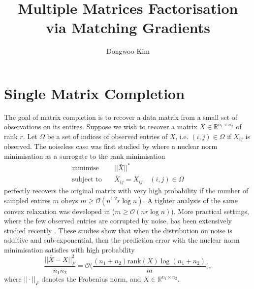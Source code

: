 \documentclass{article} %
\title{Multiple Matrices Factorisation\\ via Matching Gradients}
\author{
Dongwoo Kim
}
\theoremstyle{definition}
\begin{document}
\maketitle

\section{Single Matrix Completion}
The goal of matrix completion is to recover a data matrix from a small set of observations on its entires. Suppose we wish to recover a matrix $X \in \mathbb{R}^{n_1 \times n_2}$ of rank $r$. Let $\Omega$ be a set of indices of observed entries of $X$, i.e. $(i,j) \in \Omega$ if $X_{ij}$ is observed. The noiseless case was first studied by \cite{candes2009exact} where a nuclear norm minimisation as a surrogate to the rank minimisation
\begin{align}
\text{minimise}&\quad ||\bar{X}||^* \\
\text{subject to}&\quad \bar{X}_{ij} = X_{ij}\quad (i,j) \in \Omega 
\end{align}
perfectly recovers the original matrix with very high probability if the number of sampled entires $m$ obeys $m\geq \mathcal{O}(n^{1.2}r \log n)$. A tighter analysis of the same convex relaxation was developed in \cite{candes2010power} ($m \geq \mathcal{O}(n r \log n)$). More practical settings, where the few observed entries are corrupted by noise, has been extensively studied recently \cite{candes2010matrix,keshavan2010matrix,negahban2012restricted,klopp2014noisy,lafond2015low}. These studies show that when the distribution on noise is additive and sub-exponential, then the prediction error with the nuclear norm minimisation satisfies with high probability
\begin{equation}
\frac{||\bar{X} - X||^2_{F}}{n_1 n_2} = \mathcal{O}\bigg(
\frac{(n_1+n_2) \text{rank}(X) \log (n_1 + n_2)}{m}
\bigg),
\end{equation}
where $||\cdot||_F$ denotes the Frobenius norm, and $X\in\mathbb{R}^{n_1 \times n_2}$.
\end{document}
